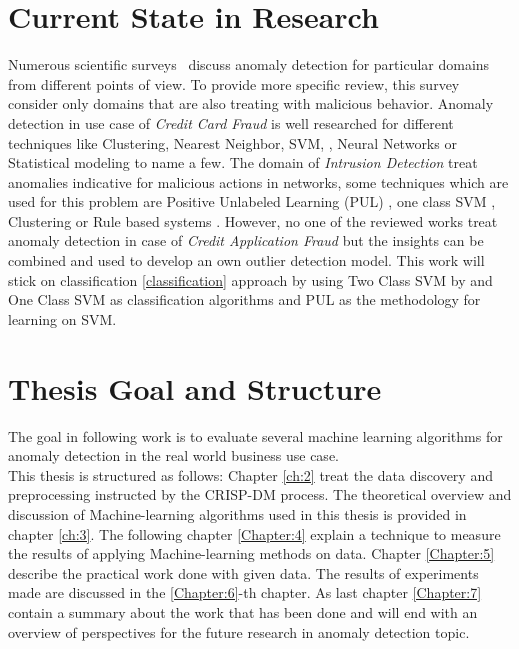 \section{Current State in Research}\label{state-of-the-art}
Numerous scientific surveys~\cite{Agyemang:2006:CSN:1609942.1609946,Chandola:2009:ADS:1541880.1541882,Chandola:2012:ADD:2197072.2197116,Pimentel:2014:RRN:2588908.2589196} discuss anomaly detection for particular domains from different points of view. To provide more specific review, this survey consider only domains that are also treating with malicious behavior. Anomaly detection in use case of \textit{Credit Card Fraud} is well researched for different techniques like Clustering, Nearest Neighbor, SVM, \cite{Eskin:2010}, Neural Networks \cite{Ghosh;Reilly;1994} or Statistical modeling \cite{Agarwal:2005} to name a few. The domain of \textit{Intrusion Detection} treat anomalies indicative for malicious actions in networks, some techniques which are used for this problem are Positive Unlabeled Learning (PUL) \cite{Eskin:2010}, one class SVM \cite{Kavitha:2015}, Clustering \cite{Chandola:2006} or Rule based systems \cite{Salvador:2005}. However, no one of the reviewed works treat anomaly detection in case of \textit{Credit Application Fraud} but the insights can be combined and used to develop an own outlier detection model. 
This work will stick on classification \ref{classification} approach by using Two Class SVM by \cite{Cortes;Vapnik:1995} and One Class SVM \cite{Tax:2004:SVD:960091.960109} as classification algorithms and PUL \cite{Elkan;Noto:2008} as the methodology for learning on SVM. %


\section{Thesis Goal and Structure}\label{goalandstructure}
The goal in following work is to evaluate several machine learning algorithms for anomaly detection in the real world business use case. \\%
This thesis is structured as follows: Chapter \ref{ch:2} treat the data discovery and preprocessing instructed by the CRISP-DM process. The theoretical overview and discussion of Machine-learning algorithms used in this thesis is provided in chapter \ref{ch:3}. The following chapter \ref{Chapter:4} explain a technique to measure the results of applying Machine-learning methods on data. Chapter \ref{Chapter:5} describe the practical work done with given data. The results of experiments made are discussed in the \ref{Chapter:6}-th chapter. As last chapter \ref{Chapter:7} contain a summary about the work that has been done and will end with an overview of perspectives for the future research in anomaly detection topic. 

